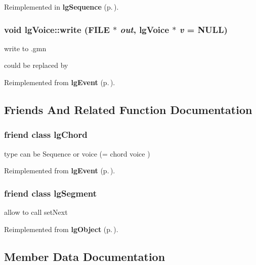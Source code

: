 Reimplemented in {\bf lg\-Sequence} {\rm (p.\,\pageref{classlgSequence_a0})}.
\subsubsection{\setlength{\rightskip}{0pt plus 5cm}void lg\-Voice::write (FILE $\ast$ {\em out}, {\bf lg\-Voice} $\ast$ {\em v} = NULL)\hspace{0.3cm}{\tt  [virtual]}}\label{classlgVoice_a21}


write to .gmn 

could be replaced by 

Reimplemented from {\bf lg\-Event} {\rm (p.\,\pageref{classlgEvent_a8})}.

\subsection{Friends And Related Function Documentation}
\subsubsection{\setlength{\rightskip}{0pt plus 5cm}friend class {\bf lg\-Chord}\hspace{0.3cm}{\tt  [friend]}}\label{classlgVoice_n0}


type can be Sequence or voice (= chord voice ) 



Reimplemented from {\bf lg\-Event} {\rm (p.\,\pageref{classlgEvent_n1})}.
\subsubsection{\setlength{\rightskip}{0pt plus 5cm}friend class {\bf lg\-Segment}\hspace{0.3cm}{\tt  [friend]}}\label{classlgVoice_n1}


allow to call set\-Next 



Reimplemented from {\bf lg\-Object} {\rm (p.\,\pageref{classlgObject_n3})}.

\subsection{Member Data Documentation}
